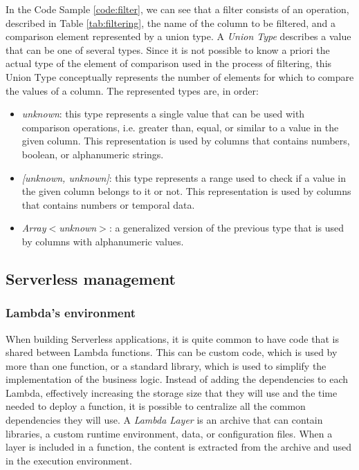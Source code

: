 In the Code Sample \ref{code:filter}, we can see that a filter consists of an operation, described in Table \ref{tab:filtering}, the name of the column to be filtered, and a comparison element represented by a union type. A \emph{Union Type} describes a value that can be one of several types. Since it is not possible to know a priori the actual type of the element of comparison used in the process of filtering, this Union Type conceptually represents the number of elements for which to compare the values of a column. The represented types are, in order:
\begin{itemize}
    \item \emph{unknown}: this type represents a single value that can be used with comparison operations, i.e. greater than, equal, or similar to a value in the given column. This representation is used by columns that contains numbers, boolean, or alphanumeric strings.
    \item \emph{[unknown, unknown]}: this type represents a range used to check if a value in the given column belongs to it or not. This representation is used by columns that contains numbers or temporal data.
    \item \emph{Array$<$unknown$>$}: a generalized version of the previous type that is used by columns with alphanumeric values.
\end{itemize}


\subsection{Serverless management} 
\subsubsection{Lambda's environment}%
When building Serverless applications, it is quite common to have code that is shared between Lambda functions. This can be custom code, which is used by more than one function, or a standard library, which is used to simplify the implementation of the business logic. Instead of adding the dependencies to each Lambda, effectively increasing the storage size that they will use and the time needed to deploy a function, it is possible to centralize all the common dependencies they will use. A \emph{Lambda Layer} is an archive that can contain libraries, a custom runtime environment, data, or configuration files. When a layer is included in a function, the content is extracted from the archive and used in the execution environment.

